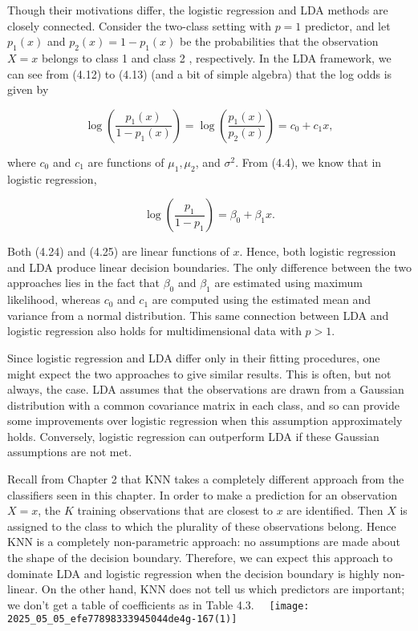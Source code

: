 \documentclass[10pt]{article}
\begin{document}
Though their motivations differ, the logistic regression and LDA methods are closely connected. Consider the two-class setting with $p=1$ predictor, and let $p_{1}(x)$ and $p_{2}(x)=1-p_{1}(x)$ be the probabilities that the observation $X=x$ belongs to class 1 and class 2 , respectively. In the LDA framework, we can see from (4.12) to (4.13) (and a bit of simple algebra) that the log odds is given by


\begin{equation*}
\log \left(\frac{p_{1}(x)}{1-p_{1}(x)}\right)=\log \left(\frac{p_{1}(x)}{p_{2}(x)}\right)=c_{0}+c_{1} x, \tag{4.24}
\end{equation*}


where $c_{0}$ and $c_{1}$ are functions of $\mu_{1}, \mu_{2}$, and $\sigma^{2}$. From (4.4), we know that in logistic regression,


\begin{equation*}
\log \left(\frac{p_{1}}{1-p_{1}}\right)=\beta_{0}+\beta_{1} x . \tag{4.25}
\end{equation*}


Both (4.24) and (4.25) are linear functions of $x$. Hence, both logistic regression and LDA produce linear decision boundaries. The only difference between the two approaches lies in the fact that $\beta_{0}$ and $\beta_{1}$ are estimated using maximum likelihood, whereas $c_{0}$ and $c_{1}$ are computed using the estimated mean and variance from a normal distribution. This same connection between LDA and logistic regression also holds for multidimensional data with $p>1$.

Since logistic regression and LDA differ only in their fitting procedures, one might expect the two approaches to give similar results. This is often, but not always, the case. LDA assumes that the observations are drawn from a Gaussian distribution with a common covariance matrix in each class, and so can provide some improvements over logistic regression when this assumption approximately holds. Conversely, logistic regression can outperform LDA if these Gaussian assumptions are not met.

Recall from Chapter 2 that KNN takes a completely different approach from the classifiers seen in this chapter. In order to make a prediction for an observation $X=x$, the $K$ training observations that are closest to $x$ are identified. Then $X$ is assigned to the class to which the plurality of these observations belong. Hence KNN is a completely non-parametric approach: no assumptions are made about the shape of the decision boundary. Therefore, we can expect this approach to dominate LDA and logistic regression when the decision boundary is highly non-linear. On the other hand, KNN does not tell us which predictors are important; we don't get a table of coefficients as in Table 4.3.\
\
\texttt{[image: 2025\_05\_05\_efe77898333945044de4g-167(1)]}
\end{document}
